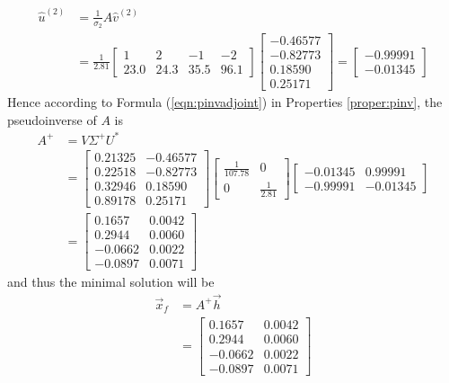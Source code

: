 \begin{solution}
\begin{align*}
\hat{u}^{(2)} &= \frac{1}{\sigma_2} A\hat{v}^{(2)} \\
&= \frac{1}{2.81} \begin{bmatrix}
1 & 2 & -1 & -2 \\
23.0 & 24.3 & 35.5 & 96.1    
\end{bmatrix}
\begin{bmatrix}
-0.46577 \\
-0.82773 \\
0.18590 \\
0.25171
\end{bmatrix} = 
\begin{bmatrix}
-0.99991 \\
-0.01345
\end{bmatrix}
\end{align*}
Hence according to Formula (\ref{eqn:pinvadjoint}) in Properties \ref{proper:pinv}, the pseudoinverse of $A$ is
\begin{align*}
A^+ &= V\Sigma^+ U^* \\
&= 
\begin{bmatrix}
0.21325 & -0.46577 \\
0.22518 & -0.82773 \\  
0.32946 & 0.18590 \\
0.89178 & 0.25171
\end{bmatrix}
\begin{bmatrix}
\frac{1}{107.78} & 0 \\
0 & \frac{1}{2.81}
\end{bmatrix}
\begin{bmatrix}
-0.01345 & 0.99991 \\
-0.99991 & -0.01345
\end{bmatrix} \\
&=
\begin{bmatrix}
0.1657 & 0.0042 \\
0.2944 & 0.0060 \\
-0.0662 & 0.0022 \\
-0.0897 & 0.0071 
\end{bmatrix}
\end{align*}
and thus the minimal solution will be
\begin{align*}
\vec{x}_f &= A^+\vec{h} \\
&= 
\begin{bmatrix}
0.1657 & 0.0042 \\
0.2944 & 0.0060 \\
-0.0662 & 0.0022 \\
-0.0897 & 0.0071 
\end{bmatrix}

\end{align*}
\end{solution}
